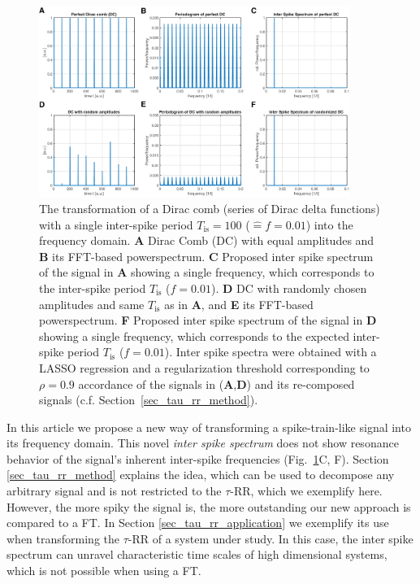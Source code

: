 \begin{figure}[h]
 \centering
 \includegraphics[width=0.9\textwidth]{./figures/fig_tau_rr_dirac_comb}
 \caption{The transformation of a Dirac comb (series of Dirac delta functions) with a single inter-spike period $T_{\text{is}}=100$ ($\widehat{=}f=0.01$) 
 into the frequency domain. 
 \textbf{A} Dirac Comb (DC) with equal amplitudes and
 \textbf{B} its FFT-based powerspectrum.
 \textbf{C} Proposed inter spike spectrum of the signal in \textbf{A} showing a single frequency, which corresponds to the inter-spike period $T_{\text{is}}$ ($f=0.01$).
 \textbf{D} DC with randomly chosen amplitudes and same $T_{\text{is}}$ as in \textbf{A}, and
 \textbf{E} its FFT-based powerspectrum. 
 \textbf{F} Proposed inter spike spectrum of the signal in \textbf{D} showing a single frequency, which corresponds to the expected inter-spike period $T_{\text{is}}$ ($f=0.01$). 
 Inter spike spectra were obtained with a LASSO regression and a regularization threshold corresponding to $\rho=0.9$ accordance of the signals in (\textbf{A},\textbf{D}) and 
 its re-composed signals (c.f. Section~\ref{sec_tau_rr_method}). 
}
\label{fig_tau_rr_dirac_comb}
\end{figure}

In this article we propose a new way of transforming a spike-train-like signal into its frequency domain. This novel \textit{inter spike spectrum} does not show resonance 
behavior of the signal's inherent inter-spike frequencies (Fig.~\ref{fig_tau_rr_dirac_comb}C, F). Section \ref{sec_tau_rr_method} explains the idea, which can be used to decompose 
any arbitrary signal and is not restricted to the $\tau$-RR, which we exemplify here. However, the more spiky the signal is, the more outstanding our new approach is compared to a 
FT. In Section \ref{sec_tau_rr_application} we exemplify its use when transforming the $\tau$-RR of a system under study. In this case, the inter spike spectrum can unravel 
characteristic time scales of high dimensional systems, which is not possible when using a FT.

